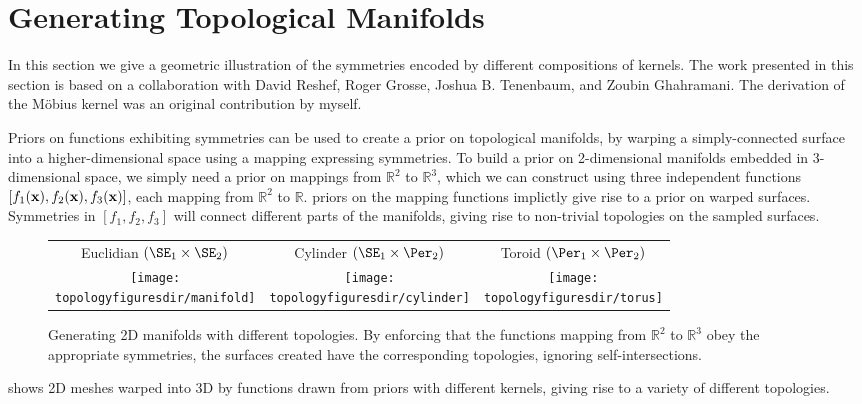 \section{Generating Topological Manifolds}
\label{sec:topological-manifolds}

In this section we give a geometric illustration of the symmetries encoded by different compositions of kernels.
The work presented in this section is based on a collaboration with David Reshef, Roger Grosse, Joshua B. Tenenbaum, and Zoubin Ghahramani.
The derivation of the M\"obius kernel was an original contribution by myself.

Priors on functions exhibiting symmetries can be used to create a prior on topological manifolds, by warping a simply-connected surface into a higher-dimensional space using a mapping expressing symmetries. %
To build a prior on 2-dimensional manifolds embedded in 3-dimensional space, we simply need a prior on mappings from $\mathbb{R}^2$ to $\mathbb{R}^3$, which we can construct using three independent functions $[f_1({\bf{x}}), f_2({\bf{x}}), f_3({\bf{x}})]$, each mapping from $\mathbb{R}^2$ to $\mathbb{R}$.
\gp{} priors on the mapping functions implictly give rise to a prior on warped surfaces.
Symmetries in $[f_1, f_2, f_3]$ will connect different parts of the manifolds, giving rise to non-trivial topologies on the sampled surfaces.
%
\begin{figure}
\renewcommand{\tabcolsep}{1mm}
\begin{tabular}{ccc}
Euclidian $( \SE_1 \times \SE_2 )$  & Cylinder $( \SE_1 \times \Per_2 )$ & Toroid $( \Per_1 \times \Per_2 )$\\
\hspace{-0.5cm}\texttt{[image: \\topologyfiguresdir/manifold]} &
\texttt{[image: \\topologyfiguresdir/cylinder]} &
\texttt{[image: \\topologyfiguresdir/torus]} \\
\end{tabular}
\caption[Generating 2D manifolds with different topological structures]{
Generating 2D manifolds with different topologies.
By enforcing that the functions mapping from $\mathbb{R}^2$ to $\mathbb{R}^3$ obey the appropriate symmetries, the surfaces created have the corresponding topologies, ignoring self-intersections.
}
\label{fig:gen_surf}
\end{figure}
%
 shows 2D meshes warped into 3D by functions drawn from \gp{} priors with different kernels, giving rise to a variety of different topologies.

